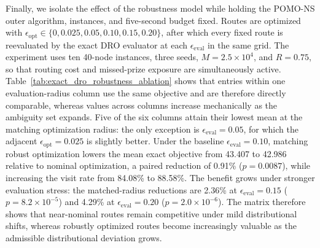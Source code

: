 \documentclass[preprint,12pt,authoryear]{elsarticle}
\theoremstyle{definition}
\begin{document}
{Finally, we isolate the effect of the robustness model while holding the POMO-NS outer algorithm, instances, and five-second budget fixed. Routes are optimized with $\epsilon_{\mathrm{opt}}\in\{0,0.025,0.05,0.10,0.15,0.20\}$, after which every fixed route is reevaluated by the exact DRO evaluator at each $\epsilon_{\mathrm{eval}}$ in the same grid. The experiment uses ten 40-node instances, three seeds, $M=2.5\times10^4$, and $R=0.75$, so that routing cost and missed-prize exposure are simultaneously active. Table~\ref{tab:exact_dro_robustness_ablation} shows that entries within one evaluation-radius column use the same objective and are therefore directly comparable, whereas values across columns increase mechanically as the ambiguity set expands.  
Five of the six columns attain their lowest mean at the matching optimization radius: 
the only exception is $\epsilon_{\mathrm{eval}}=0.05$, for which the adjacent $\epsilon_{\mathrm{opt}}=0.025$ is slightly better. 
Under the baseline $\epsilon_{\mathrm{eval}}=0.10$, matching robust optimization lowers the mean exact objective from 43.407 to 42.986 relative to nominal optimization, a paired reduction of 0.91\% ($p=0.0087$), while increasing the visit rate from 84.08\% to 88.58\%. 
The benefit grows under stronger evaluation stress: the matched-radius reductions are 2.36\% at $\epsilon_{\mathrm{eval}}=0.15$ ($p=8.2\times10^{-5}$) and 4.29\% at $\epsilon_{\mathrm{eval}}=0.20$ ($p=2.0\times10^{-6}$). 
The matrix therefore shows that near-nominal routes remain competitive under mild distributional shifts, whereas robustly optimized routes become increasingly valuable as the admissible distributional deviation grows.

}
\end{document}
